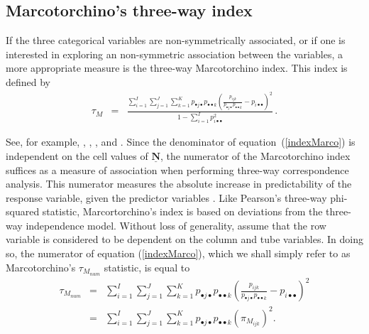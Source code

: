 \subsection{Marcotorchino's three-way index}
\label{s:marco}
If the three categorical variables are non-symmetrically associated, or if one is interested in exploring an non-symmetric association between the variables, 
a more appropriate measure is the three-way Marcotorchino index. This index is defined by
\begin{eqnarray}
\label{indexMarco}
\tau_{M} & = & \frac{\sum_{i=1}^I \sum_{j=1}^J \sum_{k=1}^K p_{\bullet j \bullet }p_{\bullet \bullet k} \left(\frac{p_{ijk}}{p_{\bullet j \bullet}p_{\bullet \bullet k}} - p_{i \bullet\bullet} \right)^2}{1-\sum_{i=1}^I p_{i\bullet\bullet}^2} \,.
\end{eqnarray}

See, for example,  \citet{mar84a, mar84b}, \citet{lom96}, \citet{beh07}, \citet[Section 11.4.2]{behlom14} and \citet[Section 7.5]{behlom21b}. Since the denominator of equation~(\ref{indexMarco}) is independent on the cell values of $\mathbf{\underline{ N}}$, the numerator of the Marcotorchino index suffices as a measure of association when performing three-way correspondence analysis. 
This numerator measures the absolute increase in predictability of the response variable, given the predictor variables \cite[]{mar85,lom96}. Like Pearson's three-way phi-squared statistic, Marcortorchino's index is based on deviations from the three-way independence model. 
Without loss of generality,  assume that the row variable is considered to be dependent on the column and tube variables. In doing so, the numerator of equation (\ref{indexMarco}), which we shall simply refer to as Marcotorchino's  $\tau_{M_{num}}$ statistic, is equal to
\begin{eqnarray}
\label{Marco}
\tau_{M_{num}} & = & \sum_{i=1}^I \sum_{j=1}^J \sum_{k=1}^K p_{\bullet j \bullet }p_{\bullet \bullet k} \left(\frac{p_{ijk}}{p_{\bullet j \bullet}p_{\bullet \bullet k}} - p_{i \bullet\bullet} \right)^2\\
&=&\sum_{i=1}^I \sum_{j=1}^J \sum_{k=1}^K p_{\bullet j \bullet }p_{\bullet \bullet k} \left(\pi_{M_{ijk}}\right)^2. \nonumber
\end{eqnarray}


